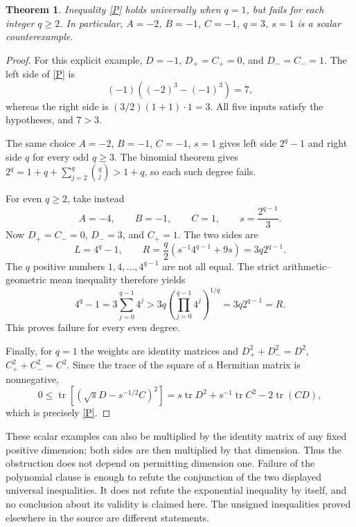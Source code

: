 \documentclass[11pt]{article}
\newtheorem{theorem}{Theorem}
\DeclareMathOperator{\tr}{tr}
\begin{document}
\begin{theorem}
Inequality \eqref{P} holds universally when $q=1$, but fails for each
integer $q\ge2$. In particular, $A=-2$, $B=-1$, $C=-1$, $q=3$, $s=1$
is a scalar counterexample.
\end{theorem}
\begin{proof}
For this explicit example, $D=-1$, $D_+=C_+=0$, and $D_-=C_-=1$.
The left side of \eqref{P} is
\[
 (-1)((-2)^3-(-1)^3)=7,
\]
whereas the right side is $(3/2)(1+1)\cdot1=3$.
All five inputs satisfy the hypotheses, and $7>3$.

The same choice $A=-2$, $B=-1$, $C=-1$, $s=1$ gives left side
$2^q-1$ and right side $q$ for every odd $q\ge3$.
The binomial theorem gives
$2^q=1+q+\sum_{j=2}^q\binom qj>1+q$, so each such degree fails.

For even $q\ge2$, take instead
\[
 A=-4,\qquad B=-1,\qquad C=1,\qquad s=\frac{2^{q-1}}3.
\]
Now $D_+=C_-=0$, $D_-=3$, and $C_+=1$. The two sides are
\[
 L=4^q-1,\qquad
 R=\frac q2\left(s^{-1}4^{q-1}+9s\right)=3q2^{q-1}.
\]
The $q$ positive numbers $1,4,\ldots,4^{q-1}$ are not all equal.
The strict arithmetic--geometric mean inequality therefore yields
\[
 4^q-1=3\sum_{j=0}^{q-1}4^j
 >3q\left(\prod_{j=0}^{q-1}4^j\right)^{1/q}
 =3q2^{q-1}=R.
\]
This proves failure for every even degree.

Finally, for $q=1$ the weights are identity matrices and
$D_+^2+D_-^2=D^2$, $C_+^2+C_-^2=C^2$. Since the trace of the square
of a Hermitian matrix is nonnegative,
\[
 0\le\tr\!\left[(\sqrt{s}D-s^{-1/2}C)^2\right]
 =s\tr D^2+s^{-1}\tr C^2-2\tr(CD),
\]
which is precisely \eqref{P}.
\end{proof}

These scalar examples can also be multiplied by the identity matrix
of any fixed positive dimension; both sides are then multiplied by
that dimension. Thus the obstruction does not depend on permitting
dimension one. Failure of the polynomial clause is enough to refute
the conjunction of the two displayed universal inequalities. It does
not refute the exponential inequality by itself, and no conclusion
about its validity is claimed here. The unsigned inequalities proved
elsewhere in the source are different statements.
\end{document}
